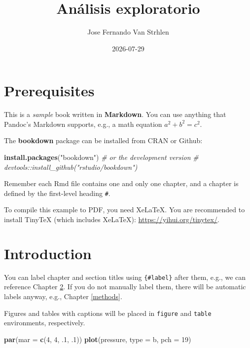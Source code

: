 \documentclass[
]{book}
\title{Análisis exploratorio}
\author{Jose Fernando Van Strhlen}
\date{2026-07-29}
\newenvironment{Shaded}{\begin{snugshade}}{\end{snugshade}}
\newcommand{\AttributeTok}[1]{\textcolor[rgb]{0.13,0.29,0.53}{#1}}
\newcommand{\CommentTok}[1]{\textcolor[rgb]{0.56,0.35,0.01}{\textit{#1}}}
\newcommand{\DecValTok}[1]{\textcolor[rgb]{0.00,0.00,0.81}{#1}}
\newcommand{\FunctionTok}[1]{\textcolor[rgb]{0.13,0.29,0.53}{\textbf{#1}}}
\newcommand{\NormalTok}[1]{#1}
\newcommand{\StringTok}[1]{\textcolor[rgb]{0.31,0.60,0.02}{#1}}
\begin{document}
\maketitle

{
\setcounter{tocdepth}{1}
\tableofcontents
}
\chapter{Prerequisites}\label{prerequisites}

This is a \emph{sample} book written in \textbf{Markdown}. You can use anything that Pandoc's Markdown supports, e.g., a math equation \(a^2 + b^2 = c^2\).

The \textbf{bookdown} package can be installed from CRAN or Github:

\begin{Shaded}
\begin{Highlighting}[]
\FunctionTok{install.packages}\NormalTok{(}\StringTok{"bookdown"}\NormalTok{)}
\CommentTok{\# or the development version}
\CommentTok{\# devtools::install\_github("rstudio/bookdown")}
\end{Highlighting}
\end{Shaded}

Remember each Rmd file contains one and only one chapter, and a chapter is defined by the first-level heading \texttt{\#}.

To compile this example to PDF, you need XeLaTeX. You are recommended to install TinyTeX (which includes XeLaTeX): \url{https://yihui.org/tinytex/}.

\chapter{Introduction}\label{intro}

You can label chapter and section titles using \texttt{\{\#label\}} after them, e.g., we can reference Chapter \ref{intro}. If you do not manually label them, there will be automatic labels anyway, e.g., Chapter \ref{methods}.

Figures and tables with captions will be placed in \texttt{figure} and \texttt{table} environments, respectively.

\begin{Shaded}
\begin{Highlighting}[]
\FunctionTok{par}\NormalTok{(}\AttributeTok{mar =} \FunctionTok{c}\NormalTok{(}\DecValTok{4}\NormalTok{, }\DecValTok{4}\NormalTok{, .}\DecValTok{1}\NormalTok{, .}\DecValTok{1}\NormalTok{))}
\FunctionTok{plot}\NormalTok{(pressure, }\AttributeTok{type =} \StringTok{\textquotesingle{}b\textquotesingle{}}\NormalTok{, }\AttributeTok{pch =} \DecValTok{19}\NormalTok{)}
\end{Highlighting}
\end{Shaded}
\end{document}
